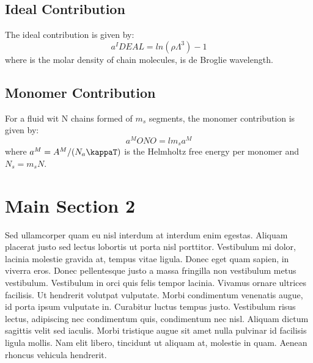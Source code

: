 \subsection{Ideal Contribution}

The ideal contribution is given by:
\begin{equation}
a^IDEAL = ln(\rho\Lambda^3) -1
\label{eqn:aideal}
\end{equation}
where \rho is the molar density of chain molecules, \lambda is de Broglie wavelength. 

\subsection{Monomer Contribution}
For a fluid wit N chains formed of $m_s$ segments, the monomer contribution is given by:
\begin{equation}
a^MONO = lm_sa^M
\label{eqn:amonomer}
\end{equation}
where $a^M = A^M/(N_a\kappaT)$ is the Helmholtz free energy per monomer and $N_s = m_sN$. 

\section{Main Section 2}

Sed ullamcorper quam eu nisl interdum at interdum enim egestas. Aliquam placerat justo sed lectus lobortis ut porta nisl porttitor. Vestibulum mi dolor, lacinia molestie gravida at, tempus vitae ligula. Donec eget quam sapien, in viverra eros. Donec pellentesque justo a massa fringilla non vestibulum metus vestibulum. Vestibulum in orci quis felis tempor lacinia. Vivamus ornare ultrices facilisis. Ut hendrerit volutpat vulputate. Morbi condimentum venenatis augue, id porta ipsum vulputate in. Curabitur luctus tempus justo. Vestibulum risus lectus, adipiscing nec condimentum quis, condimentum nec nisl. Aliquam dictum sagittis velit sed iaculis. Morbi tristique augue sit amet nulla pulvinar id facilisis ligula mollis. Nam elit libero, tincidunt ut aliquam at, molestie in quam. Aenean rhoncus vehicula hendrerit.